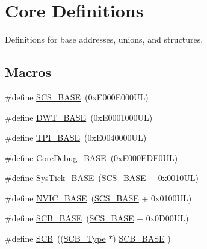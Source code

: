 \hypertarget{group___c_m_s_i_s__core__base}{}\section{Core Definitions}
\label{group___c_m_s_i_s__core__base}


Definitions for base addresses, unions, and structures.  


\subsection*{Macros}
\begin{DoxyCompactItemize}
\item 
\#define \hyperlink{group___c_m_s_i_s__core__base_ga3c14ed93192c8d9143322bbf77ebf770}{S\+C\+S\+\_\+\+B\+A\+SE}~(0x\+E000\+E000\+U\+L)
\item 
\#define \hyperlink{group___c_m_s_i_s__core__base_gafdab534f961bf8935eb456cb7700dcd2}{D\+W\+T\+\_\+\+B\+A\+SE}~(0x\+E0001000\+U\+L)
\item 
\#define \hyperlink{group___c_m_s_i_s__core__base_ga2b1eeff850a7e418844ca847145a1a68}{T\+P\+I\+\_\+\+B\+A\+SE}~(0x\+E0040000\+U\+L)
\item 
\#define \hyperlink{group___c_m_s_i_s__core__base_ga680604dbcda9e9b31a1639fcffe5230b}{Core\+Debug\+\_\+\+B\+A\+SE}~(0x\+E000\+E\+D\+F0\+U\+L)
\item 
\#define \hyperlink{group___c_m_s_i_s__core__base_ga58effaac0b93006b756d33209e814646}{Sys\+Tick\+\_\+\+B\+A\+SE}~(\hyperlink{group___c_m_s_i_s__core__base_ga3c14ed93192c8d9143322bbf77ebf770}{S\+C\+S\+\_\+\+B\+A\+SE} +  0x0010\+U\+L)
\item 
\#define \hyperlink{group___c_m_s_i_s__core__base_gaa0288691785a5f868238e0468b39523d}{N\+V\+I\+C\+\_\+\+B\+A\+SE}~(\hyperlink{group___c_m_s_i_s__core__base_ga3c14ed93192c8d9143322bbf77ebf770}{S\+C\+S\+\_\+\+B\+A\+SE} +  0x0100\+U\+L)
\item 
\#define \hyperlink{group___c_m_s_i_s__core__base_gad55a7ddb8d4b2398b0c1cfec76c0d9fd}{S\+C\+B\+\_\+\+B\+A\+SE}~(\hyperlink{group___c_m_s_i_s__core__base_ga3c14ed93192c8d9143322bbf77ebf770}{S\+C\+S\+\_\+\+B\+A\+SE} +  0x0\+D00\+U\+L)
\item 
\#define \hyperlink{group___c_m_s_i_s__core__base_gaaaf6477c2bde2f00f99e3c2fd1060b01}{S\+CB}~((\hyperlink{struct_s_c_b___type}{S\+C\+B\+\_\+\+Type}       $\ast$)     \hyperlink{group___c_m_s_i_s__core__base_gad55a7ddb8d4b2398b0c1cfec76c0d9fd}{S\+C\+B\+\_\+\+B\+A\+SE}         )
\item 

\end{DoxyCompactItemize}
